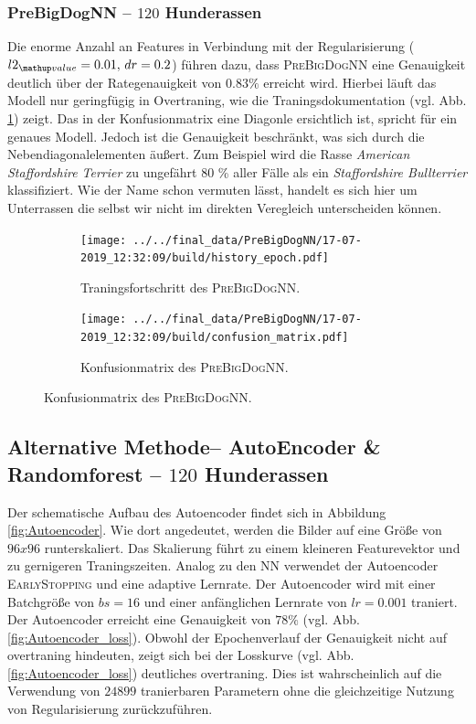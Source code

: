 \subsubsection{PreBigDogNN -- $120$ Hunderassen}
Die enorme Anzahl an Features in Verbindung mit der Regularisierung ($l2\ua{value}=0.01, \, dr=0.2$)
führen dazu, dass \textsc{PreBigDogNN} eine Genauigkeit deutlich über der Rategenauigkeit
von $0.83\%$ erreicht wird. Hierbei läuft das Modell nur geringfügig in Overtraning,
wie die Traningsdokumentation (vgl. Abb. \ref{fig:PreBigDogNN_Loss_Acc}) zeigt.
Das in der Konfusionmatrix eine Diagonle ersichtlich ist, spricht für ein genaues Modell.
Jedoch ist die Genauigkeit beschränkt, was sich durch die Nebendiagonalelementen
äußert. Zum Beispiel wird die Rasse \emph{American Staffordshire Terrier}
zu ungefährt 80 \% aller Fälle als ein \emph{Staffordshire Bullterrier} klassifiziert.
Wie der Name schon vermuten lässt, handelt es sich hier um Unterrassen die
selbst wir nicht im direkten Veregleich unterscheiden können.
\begin{figure}
\centering
\begin{subfigure}{0.48\textwidth}
\centering
\texttt{[image: ../../final\_data/PreBigDogNN/17-07-2019\_12:32:09/build/history\_epoch.pdf]}
\caption{Traningsfortschritt des \textsc{PreBigDogNN}.}
\label{fig:PreBigDogNN_Loss_Acc}
\end{subfigure}
\begin{subfigure}{0.48\textwidth}
\centering
\texttt{[image: ../../final\_data/PreBigDogNN/17-07-2019\_12:32:09/build/confusion\_matrix.pdf]}
\caption{Konfusionmatrix des \textsc{PreBigDogNN}.}
\label{fig:PreBigDogNN_Konfusionmatrix}
\end{subfigure}
\end{figure}
\subsection{Alternative Methode-- AutoEncoder \& Randomforest -- $120$ Hunderassen}
Der schematische Aufbau des Autoencoder findet sich in Abbildung \ref{fig:Autoencoder}.
Wie dort angedeutet, werden die Bilder auf eine Größe von $96x96$ runterskaliert.
Das Skalierung führt zu einem kleineren Featurevektor und zu gernigeren
Traningszeiten. Analog zu den NN verwendet der Autoencoder \textsc{EarlyStopping}
und eine adaptive Lernrate. Der Autoencoder wird mit einer Batchgröße
von $bs=16$ und einer anfänglichen Lernrate von $lr=0.001$ traniert. Der Autoencoder
erreicht eine Genauigkeit von $78\%$ (vgl. Abb. \ref{fig:Autoencoder_loss}). Obwohl der Epochenverlauf
der Genauigkeit nicht auf overtraning hindeuten, zeigt sich bei der Losskurve
(vgl. Abb. \ref{fig:Autoencoder_loss}) deutliches overtraning. Dies ist wahrscheinlich auf die
Verwendung von $24899$ tranierbaren Parametern ohne die gleichzeitige
Nutzung von Regularisierung zurückzuführen.

